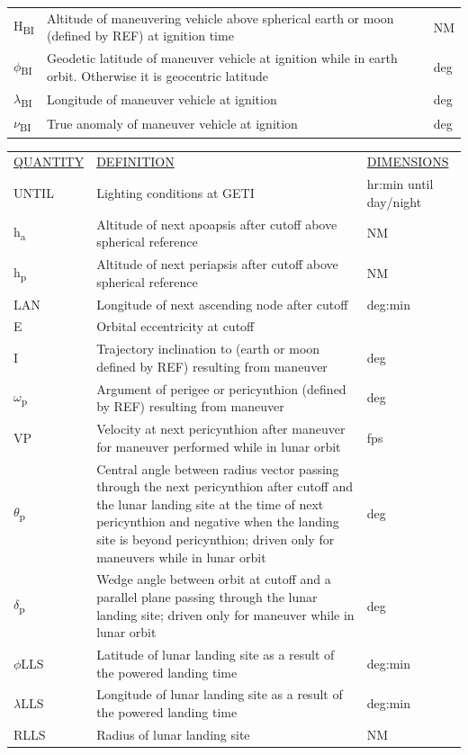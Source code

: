 \documentclass[11pt]{article} %
\begin{document}
\begin{center}
\begin{tabular}{ L{2.4cm} L{7.1cm} L{3cm} }
H\textsubscript{BI}&Altitude of maneuvering vehicle above spherical earth or moon (defined by REF) at ignition time&NM\\
$\phi$\textsubscript{BI}&Geodetic latitude of maneuver vehicle at ignition while in earth orbit. Otherwise it is geocentric latitude&deg\\
$\lambda$\textsubscript{BI}&Longitude of maneuver vehicle at ignition&deg\\
$\nu$\textsubscript{BI}&True anomaly of maneuver vehicle at ignition&deg\\
\end{tabular}
\newpage
\begin{tabular}{ L{2.4cm} L{7.1cm} L{3cm} }
\underline{QUANTITY} & \underline{DEFINITION} & \underline{DIMENSIONS} \\
UNTIL&Lighting conditions at GETI&hr:min until day/night\\
h\textsubscript{a}&Altitude of next apoapsis after cutoff above spherical reference&NM\\
h\textsubscript{p}&Altitude of next periapsis after cutoff above spherical reference&NM\\
LAN&Longitude of next ascending node after cutoff&deg:min\\
E&Orbital eccentricity at cutoff\\
I&Trajectory inclination to (earth or moon defined by REF) resulting from maneuver&deg\\
$\omega$\textsubscript{p}&Argument of perigee or pericynthion (defined by REF) resulting from maneuver&deg\\
VP&Velocity at next pericynthion after maneuver for maneuver performed while in lunar orbit&fps\\
$\theta$\textsubscript{p}&Central angle between radius vector passing through the next pericynthion after cutoff and the lunar landing
site at the time of next pericynthion and negative when the landing site is beyond pericynthion; driven only for maneuvers while in lunar orbit&deg\\
$\delta$\textsubscript{p}&Wedge angle between orbit at cutoff and a parallel plane passing through the lunar landing site; driven
only for maneuver while in lunar orbit&deg\\
$\phi$LLS&Latitude of lunar landing site as a result of the powered landing time&deg:min\\
$\lambda$LLS&Longitude of lunar landing site as a result of the powered landing time&deg:min\\
RLLS&Radius of lunar landing site&NM\\

\end{tabular}
\end{center}
\end{document}
